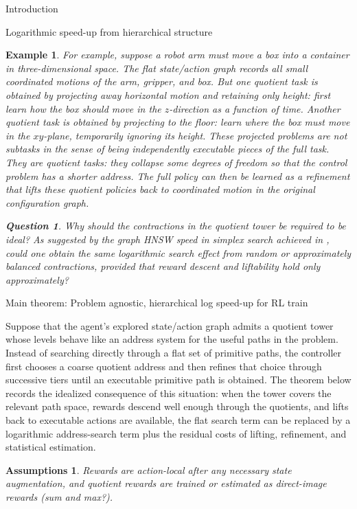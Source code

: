 \documentclass[11pt]{article}
\newtheorem{assumptions}[subsubsection]{Assumptions}
\newtheorem{example}[subsubsection]{Example}
\newtheorem{question}[]{Question}
\begin{document}
\begin{section}{Introduction}
\begin{subsection}{Logarithmic speed-up from hierarchical structure}
\begin{example}
For example, suppose a robot arm must move a box into a container in three-dimensional space. The flat state/action graph records all small coordinated motions of the arm, gripper, and box. But one quotient task is obtained by projecting away horizontal motion and retaining only height: first learn how the box should move in the $z$-direction as a function of time. Another quotient task is obtained by projecting to the floor: learn where the box must move in the $xy$-plane, temporarily ignoring its height. These projected problems are not subtasks in the sense of being independently executable pieces of the full task. They are quotient tasks: they collapse some degrees of freedom so that the control problem has a shorter address. The full policy can then be learned as a refinement that lifts these quotient policies back to coordinated motion in the original configuration graph.

\begin{question}
Why should the contractions in the quotient tower be required to be ideal?  As suggested by the graph HNSW speed in simplex search achieved in \cite{MalikThesis}, could one obtain the same logarithmic search effect from random or approximately balanced contractions, provided that reward descent and liftability hold only approximately?
\end{question}
\end{example}


\end{subsection}

\begin{subsection}{Main theorem: Problem agnostic, hierarchical log speed-up for RL train}

Suppose that the agent's explored state/action graph admits a quotient tower whose levels behave like an address system for the useful paths in the problem. Instead of searching directly through a flat set of primitive paths, the controller first chooses a coarse quotient address and then refines that choice through successive tiers until an executable primitive path is obtained. The theorem below records the idealized consequence of this situation: when the tower covers the relevant path space, rewards descend well enough through the quotients, and lifts back to executable actions are available, the flat search term can be replaced by a logarithmic address-search term plus the residual costs of lifting, refinement, and statistical estimation.

\begin{assumptions}\label{ass: simple ass}
Rewards are action-local after any necessary state augmentation, and quotient rewards are trained or estimated as direct-image rewards (sum and max?).
 


\end{assumptions}
\end{subsection}
\end{section}
\end{document}
